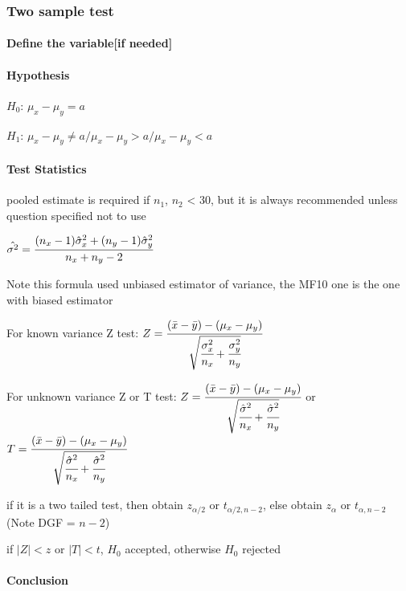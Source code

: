 \documentclass[]{article}
\let\oldparagraph\paragraph
\renewcommand{\paragraph}[1]{\oldparagraph{#1}\mbox{}}
\begin{document}
\subsubsection{Two sample test}\label{header-n185}

\paragraph{Define the variable{[}if needed{]}}\label{header-n186}

\paragraph{Hypothesis}\label{header-n187}

\(H_0\): \(\mu_x - \mu_y = a\)

\(H_1\): \(\mu_x - \mu_y \ne a /\mu_x - \mu_y> a /\mu_x - \mu_y < a\)

\paragraph{Test Statistics}\label{header-n190}

pooled estimate is required if \(n_1\), \(n_2\) \textless{} 30, but it
is always recommended unless question specified not to use

\(\hat{\sigma^2} = \cfrac{(n_x-1)\hat{\sigma}^2_x + (n_y-1)\hat{\sigma}^2_y}{n_x + n_y -2}\)

Note this formula used unbiased estimator of variance, the MF10 one is
the one with biased estimator

For known variance Z test:
\(Z = \cfrac{(\bar{x} - \bar{y}) - (\mu_x - \mu_y)}{\sqrt{\cfrac{{\sigma}^2_x}{n_x} + \cfrac{{\sigma}^2_y}{n_y}}}\)

For unknown variance Z or T test:
\(Z = \cfrac{(\bar{x} - \bar{y}) - (\mu_x - \mu_y)}{\sqrt{\cfrac{\hat{\sigma}^2}{n_x} + \cfrac{\hat{\sigma}^2}{n_y}}}\)
or
\(T =\cfrac{(\bar{x} - \bar{y}) - (\mu_x - \mu_y)}{\sqrt{\cfrac{\hat{\sigma}^2}{n_x} + \cfrac{\hat{\sigma}^2}{n_y}}}\)

if it is a two tailed test, then obtain \(z_{\alpha/2}\) or
\(t_{\alpha/2 , n-2}\), else obtain \(z_{\alpha}\) or
\(t_{\alpha, n-2}\)(Note DGF = \(n-2\))

if \(|Z| < z\) or \(|T| < t\), \(H_0\) accepted, otherwise \(H_0\)
rejected

\paragraph{Conclusion}\label{header-n198}
\end{document}
